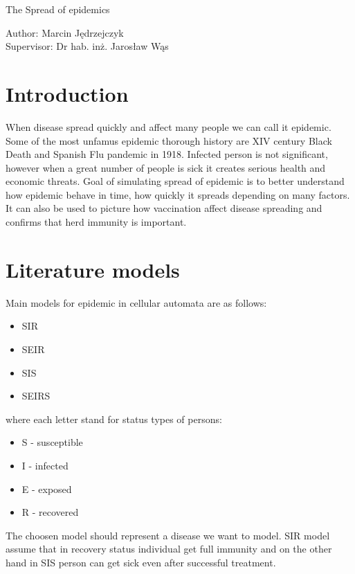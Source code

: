 \documentclass[a4paper, 11pt]{article}
\begin{document}
\renewcommand\refname{Bibliography}
\renewcommand{\figurename}{Figure}
	\begin{center}
			\begin{LARGE}
			The Spread of epidemics\\[1cm]
		    \end{LARGE}
	    	\begin{Large}
	    		Author: Marcin Jędrzejczyk \\
	    		Supervisor: Dr hab. inż. Jarosław Wąs\\[1cm]
	    	\end{Large}
	\end{center}

	\section{Introduction}
	When disease spread quickly and affect many people we can call it epidemic. Some of the most unfamus epidemic thorough history are XIV century Black Death and Spanish  Flu pandemic in 1918. Infected person is not significant, however when a great number of people is sick it creates serious health and economic threats. Goal of simulating spread of epidemic is to better understand how epidemic behave in time, how quickly it spreads depending on many factors.\cite{WHITE} It can also be used to picture how vaccination affect disease spreading and confirms that herd immunity is important.
	\section{Literature models}
	Main models for epidemic in cellular automata are as follows:\\
	\begin{itemize}
		\item SIR
		\item SEIR
		\item SIS
		\item SEIRS	
	\end{itemize}
	where each letter stand for status types of persons:
	\begin{itemize}
		\item S - susceptible 
		\item I - infected 
		\item E - exposed
		\item R - recovered
	\end{itemize}
	The choosen model should represent a disease we want to model. SIR model assume that in recovery status individual get full immunity and on the other hand in SIS person can get sick even after successful treatment.\cite{WHITE}\\
	
\end{document}
